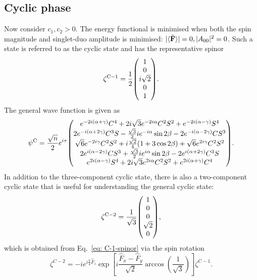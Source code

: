\subsection{Cyclic phase}
Now consider \(c_1, c_2 > 0\).
The energy functional is minimised when both the spin magnitude and singlet-duo
amplitude is minimised: \(|\langle \hat{\vb{F}} \rangle | = 0, |A_{00}|^2=0\).
Such a state is referred to as the cyclic state and has the representative
spinor
\begin{equation}
    \zeta^\mathrm{C-1} = \frac{1}{2}\mqty(1 \\ 0 \\ i\sqrt{2} \\ 0 \\ 1).
    \label{eq: C-1-spinor}
\end{equation}
The general wave function is given as
\begin{equation}\label{eq: general-cyclic-wfn}
    \psi^\mathrm{C} = \frac{\sqrt{n}}{2}e^{i\tau} \mqty(
    e^{-2i(\alpha+\gamma)}C^4 + 2i\sqrt{3}e^{-2i\alpha}C^2S^2
    + e^{-2i(\alpha-\gamma)}S^4
    \\
    2e^{-i(\alpha+2\gamma)}C^3S - \frac{\sqrt{3}}{2}ie^{-i\alpha}\sin 2\beta
    - 2e^{-i(\alpha-2\gamma)}CS^3
    \\
    \sqrt{6}e^{-2i\gamma}C^2S^2 + i\frac{\sqrt{2}}{4}(1+3\cos 2\beta)
    + \sqrt{6}e^{2i\gamma}C^2S^2
    \\
    2e^{i(\alpha-2\gamma)}CS^3 + \frac{\sqrt{3}}{2}ie^{i\alpha}\sin 2\beta
    - 2e^{i(\alpha+2\gamma)}C^3S
    \\
    e^{2i(\alpha-\gamma)}S^4 + 2i\sqrt{3}e^{2i\alpha}C^2S^2
    + e^{2i(\alpha+\gamma)}C^4
    ).
\end{equation}
In addition to the three-component cyclic state, there is also a two-component
cyclic state that is useful for understanding the general cyclic state:
\begin{equation}
    \zeta^\mathrm{C-2} = \frac{1}{\sqrt{3}}\mqty(1  \\ 0 \\ 0 \\ \sqrt{2} \\ 0),
    \label{eq: C-2-spinor}
\end{equation}
which is obtained from Eq.~\eqref{eq: C-1-spinor} via the spin
rotation~\cite{Kawaguchi2012}
\begin{equation}
    \zeta^{C-2} = -ie^{i\frac{\pi}{4}\hat{F}_z}
    \exp\left[i\frac{\hat{F}_x-\hat{F}_y}{\sqrt{2}}
        \arccos{\left(\frac{1}{\sqrt{3}}\right)}\right]\zeta^\mathrm{C-1}.
\end{equation}

